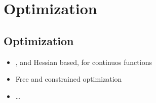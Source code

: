 \documentclass[letterpaper,10pt,english]{jupyterBook}
\begin{document}
\part{Optimization}

\sphinxstepscope


\chapter{Optimization}
\label{\detokenize{ch/optimization/intro:optimization}}\label{\detokenize{ch/optimization/intro:id1}}\label{\detokenize{ch/optimization/intro::doc}}\begin{itemize}
\item {} 
\sphinxAtStartPar
{}, and Hessian based, for continuos functions

\item {} 
\sphinxAtStartPar
Free and constrained optimization

\item {} 
\sphinxAtStartPar
…

\end{itemize}
\end{document}
